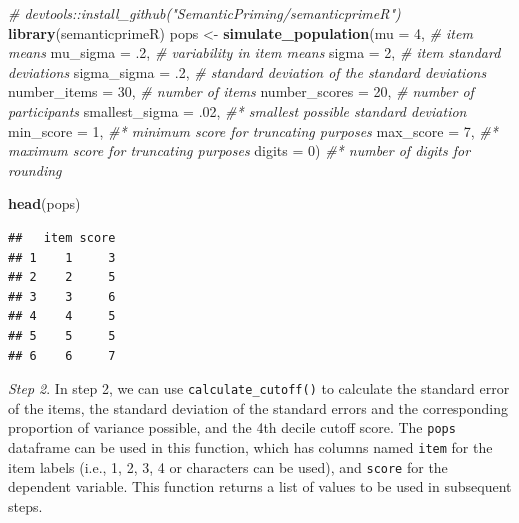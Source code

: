 \documentclass[
  man]{apa7}
\newenvironment{Shaded}{\begin{snugshade}}{\end{snugshade}}
\newcommand{\AttributeTok}[1]{\textcolor[rgb]{0.13,0.29,0.53}{#1}}
\newcommand{\CommentTok}[1]{\textcolor[rgb]{0.56,0.35,0.01}{\textit{#1}}}
\newcommand{\DecValTok}[1]{\textcolor[rgb]{0.00,0.00,0.81}{#1}}
\newcommand{\FunctionTok}[1]{\textcolor[rgb]{0.13,0.29,0.53}{\textbf{#1}}}
\newcommand{\NormalTok}[1]{#1}
\newcommand{\OtherTok}[1]{\textcolor[rgb]{0.56,0.35,0.01}{#1}}
\begin{document}
\begin{Shaded}
\begin{Highlighting}[]
\CommentTok{\# devtools::install\_github("SemanticPriming/semanticprimeR")}
\FunctionTok{library}\NormalTok{(semanticprimeR)}
\NormalTok{pops }\OtherTok{\textless{}{-}} \FunctionTok{simulate\_population}\NormalTok{(}\AttributeTok{mu =} \DecValTok{4}\NormalTok{, }\CommentTok{\# item means}
  \AttributeTok{mu\_sigma =}\NormalTok{ .}\DecValTok{2}\NormalTok{, }\CommentTok{\# variability in item means }
  \AttributeTok{sigma =} \DecValTok{2}\NormalTok{, }\CommentTok{\# item standard deviations}
  \AttributeTok{sigma\_sigma =}\NormalTok{ .}\DecValTok{2}\NormalTok{, }\CommentTok{\# standard deviation of the standard deviations}
  \AttributeTok{number\_items =} \DecValTok{30}\NormalTok{, }\CommentTok{\# number of items}
  \AttributeTok{number\_scores =} \DecValTok{20}\NormalTok{, }\CommentTok{\# number of participants}
  \AttributeTok{smallest\_sigma =}\NormalTok{ .}\DecValTok{02}\NormalTok{, }\CommentTok{\#* smallest possible standard deviation}
  \AttributeTok{min\_score =} \DecValTok{1}\NormalTok{, }\CommentTok{\#* minimum score for truncating purposes}
  \AttributeTok{max\_score =} \DecValTok{7}\NormalTok{, }\CommentTok{\#* maximum score for truncating purposes}
  \AttributeTok{digits =} \DecValTok{0}\NormalTok{) }\CommentTok{\#* number of digits for rounding}
  
\FunctionTok{head}\NormalTok{(pops)}
\end{Highlighting}
\end{Shaded}

\begin{verbatim}
##   item score
## 1    1     3
## 2    2     5
## 3    3     6
## 4    4     5
## 5    5     5
## 6    6     7
\end{verbatim}

\emph{Step 2}. In step 2, we can use \texttt{calculate\_cutoff()} to calculate the standard error of the items, the standard deviation of the standard errors and the corresponding proportion of variance possible, and the 4th decile cutoff score. The \texttt{pops} dataframe can be used in this function, which has columns named \texttt{item} for the item labels (i.e., 1, 2, 3, 4 or characters can be used), and \texttt{score} for the dependent variable. This function returns a list of values to be used in subsequent steps.
\end{document}
